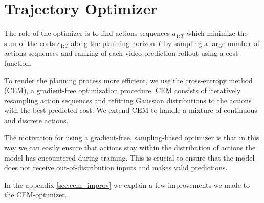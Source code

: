 \section{Trajectory Optimizer}
\label{sec:optimizer}
The role of the optimizer is to find actions sequences $a_{1:T}$ which minimize the sum of the costs $c_{1:T}$ along the planning horizon $T$ by sampling a large number of actions sequences and ranking of each video-prediction rollout using a cost function.

To render the planning process more efficient, we use the cross-entropy method (CEM), a gradient-free optimization procedure.
CEM consists of iteratively resampling action sequences and refitting Gaussian distributions to the actions with the best predicted cost. 
We extend CEM to handle a mixture of continuous and discrete actions.

The motivation for using a gradient-free, sampling-based optimizer is that in this way we can easily ensure that actions stay within the distribution of actions the model has encountered during training. This is crucial to ensure that the model does not receive out-of-distribution inputs and makes valid predictions. 

In the appendix \ref{sec:cem_improv} we explain a few improvements we made to the CEM-optimizer.